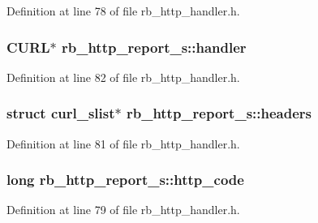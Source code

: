 Definition at line 78 of file rb\+\_\+http\+\_\+handler.\+h.

\hypertarget{structrb__http__report__s_acbc5a7e21356d5e35d19363db4fed9ca}{}
\subsubsection[{handler}]{\setlength{\rightskip}{0pt plus 5cm}C\+U\+R\+L$\ast$ rb\+\_\+http\+\_\+report\+\_\+s\+::handler}\label{structrb__http__report__s_acbc5a7e21356d5e35d19363db4fed9ca}


Definition at line 82 of file rb\+\_\+http\+\_\+handler.\+h.

\hypertarget{structrb__http__report__s_a2bb10e85675569e7ed4cdb87055241b7}{}
\subsubsection[{headers}]{\setlength{\rightskip}{0pt plus 5cm}struct curl\+\_\+slist$\ast$ rb\+\_\+http\+\_\+report\+\_\+s\+::headers}\label{structrb__http__report__s_a2bb10e85675569e7ed4cdb87055241b7}


Definition at line 81 of file rb\+\_\+http\+\_\+handler.\+h.

\hypertarget{structrb__http__report__s_a44a22dfbde3f5d2c5eafba73f5be2afa}{}
\subsubsection[{http\+\_\+code}]{\setlength{\rightskip}{0pt plus 5cm}long rb\+\_\+http\+\_\+report\+\_\+s\+::http\+\_\+code}\label{structrb__http__report__s_a44a22dfbde3f5d2c5eafba73f5be2afa}


Definition at line 79 of file rb\+\_\+http\+\_\+handler.\+h.

\hypertarget{structrb__http__report__s_a7752d311c68a4f7019eebb162cb72553}{}
